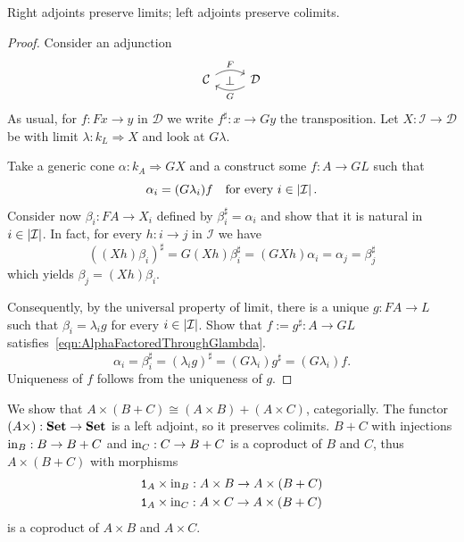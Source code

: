 
\begin{proposition}
  Right adjoints preserve limits; left adjoints preserve colimits.
\end{proposition}

\begin{proof}
  Consider an adjunction
  \[
    \begin{tikzcd}
      \mathcal{C} \ar["F"{name=L}, r, bend left] & \mathcal{D} \ar["G"{name=R}, l,
      bend left] \ar["{\perp}"{description}, from=L, to=R, phantom]
    \end{tikzcd}
  \]
  As usual, for \(f : Fx \to y\) in \(\mathcal{D}\) we write
  \(f^\sharp : x \to Gy\) the transposition. Let
  \(X : \mathcal{I} \to \mathcal{D}\) be with limit
  \(\lambda : k_L \Rightarrow X\) and look at \(G\lambda\).

  Take a generic cone \(\alpha : k_A \Rightarrow GX\) and a construct some
  \(f : A \to GL\) such that
  \begin{equation}
    \alpha_i = (G\lambda_i) f \quad \text{for every } i \in \left\lvert\mathcal{I}\right\rvert .
    \label{eqn:AlphaFactoredThroughGlambda}
  \end{equation}
  Consider now \(\beta_i : FA \to X_i\) defined by
  \(\beta_i^\sharp = \alpha_i\) and show that it is natural in
  \(i \in \left\lvert\mathcal{I}\right\rvert\). In fact, for every \(h : i \to j\) in
  \(\mathcal{I}\) we have
  \[
    \left( (Xh) \beta_i \right)^\sharp = G(Xh) \beta_i^\sharp = (GX h) \alpha_i = \alpha_j = \beta_j^\sharp
  \]
  which yields \(\beta_j = (Xh) \beta_i\).

  Consequently, by the universal property of limit, there is a unique
  \(g : FA \to L\) such that \(\beta_i = \lambda_i g\) for every
  \(i \in \left\lvert\mathcal{I}\right\rvert\). Show that \(f := g^\sharp : A \to GL\)
  satisfies~\eqref{eqn:AlphaFactoredThroughGlambda}.
  \[
    \alpha_i = \beta_i^\sharp = \left( \lambda_i g \right)^\sharp = (G\lambda_i) g^\sharp = (G\lambda_i) f .
  \]
  Uniqueness of \(f\) follows from the uniqueness of \(g\).
\end{proof}

\begin{example}
  We show that \(A \times (B + C) \cong (A \times B) + (A \times C)\), categorially. The
  functor \((A \times) : \mathbf{Set} \to \mathbf{Set}\) is a left adjoint, so it preserves
  colimits. \(B+C\) with injections \(\operatorname{in}_B : B \to B+C\) and
  \(\operatorname{in}_C : C \to B+C\) is a coproduct of \(B\) and \(C\), thus \(A \times
  (B+C)\) with morphisms
  \begin{align*}
    & \mathtt 1_A \times \operatorname{in}_B : A \times B \to A \times (B + C) \\
    & \mathtt 1_A \times \operatorname{in}_C : A \times C \to A \times (B + C) 
  \end{align*}
  is a coproduct of \(A \times B\) and \(A \times C\).
\end{example}



